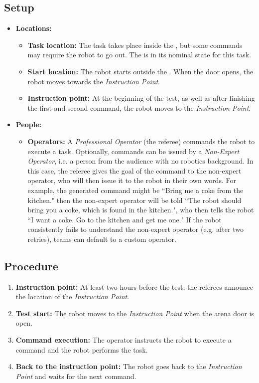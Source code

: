 \subsection*{Setup}
\begin{itemize}[nosep]
    \item \textbf{Locations:}
        \begin{itemize}
            \item \textbf{Task location:} The task takes place inside the \Arena{}, but some commands may require the robot to go out. The \Arena{} is in its nominal state for this task.
            \item \textbf{Start location:} The robot starts outside the \Arena{}. When the door opens, the robot moves towards the \textit{Instruction Point}.
            \item \textbf{Instruction point:} At the beginning of the test, as well as after finishing the first and second command, the robot moves to the \textit{Instruction Point}.
        \end{itemize}
    \item \textbf{People:}
        \begin{itemize}
            \item \textbf{Operators:} A \emph{Professional Operator} (the referee) commands the robot to execute a task.
            Optionally, commands can be issued by a \emph{Non-Expert Operator}, i.e. a person from the audience with no robotics background.
            In this case, the referee gives the goal of the command to the non-expert operator, who will then issue it to the robot in their own words. For example, the generated command might be ``Bring me a coke from the kitchen." then the non-expert operator will be told ``The robot should bring you a coke, which is found in the kitchen.", who then tells the robot ``I want a coke. Go to the kitchen and get me one."
            If the robot consistently fails to understand the non-expert operator (e.g. after two retries), teams can default to a custom operator.
        \end{itemize}
\end{itemize}


\subsection*{Procedure}
\begin{enumerate}[nosep]
	\item \textbf{Instruction point:} At least two hours before the test, the referees announce the location of the \textit{Instruction Point}.
	\item \textbf{Test start:} The robot moves to the \textit{Instruction Point} when the arena door is open.
	\item \textbf{Command execution:} The operator instructs the robot to execute a command and the robot performs the task.
	\item \textbf{Back to the instruction point:} The robot goes back to the \textit{Instruction Point} and waits for the next command.
\end{enumerate}


